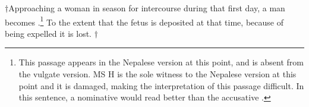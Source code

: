 \begin{translation}
$\dag$Approaching a woman in season for intercourse during that first
day, a man becomes .\footnote{This
    passage appears in the Nepalese version at this point, and is absent
    from the vulgate version.  MS H is the sole witness to the Nepalese
    version at this point and it is damaged, making the interpretation of this
    passage difficult.  In this sentence, a nominative would read
    better than the accusative .} %
    To the extent that the fetus is deposited at that time, because of
    being expelled it is lost. $\dag$


\bigskip

%
%
%
%
%
%
%

\end{translation}
